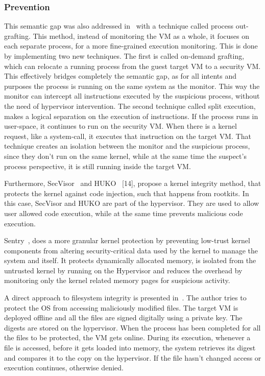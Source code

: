 \subsubsection{Prevention}

\par This semantic gap was also addressed in~\cite{srinivasan2011process} with a technique called process out-grafting. This method, instead of monitoring the \ac{VM} as a whole, it focuses on each separate process, for a more fine-grained execution monitoring. This is done by implementing two new techniques. The first is called on-demand grafting, which can relocate a running process from the guest target \ac{VM} to a security \ac{VM}. This effectively bridges completely the semantic gap, as for all intents and purposes the process is running on the same system as the monitor. This way the monitor can intercept all instructions executed by the suspicious process, without the need of hypervisor intervention. The second technique called split execution, makes a logical separation on the execution of instructions. If the process runs in user-space, it continues to run on the security \ac{VM}. When there is a kernel request, like a system-call, it executes that instruction on the target \ac{VM}. That technique creates an isolation between the monitor and the suspicious process, since they don’t run on the same kernel, while at the same time the suspect’s process perspective, it is still running inside the target \ac{VM}. 


\par Furthermore, SecVisor~\cite{seshadri2007secvisor} and HUKO~\cite{xiong2011practical} [14], propose a kernel integrity method, that protects the kernel against code injection, such that happens from rootkits. In this case, SecVisor and HUKO are part of the hypervisor. They are used to allow user allowed code execution, while at the same time prevents malicious code execution.


\par Sentry~\cite{srivastava2012efficient}, does a more granular kernel protection by preventing low-trust kernel components from altering security-critical data used by the kernel to manage the system and itself. It protects dynamically allocated memory, is isolated from the untrusted kernel by running on the Hypervisor and reduces the overhead by monitoring only the kernel related memory pages for suspicious activity.


\par A direct approach to filesystem integrity is presented in~\cite{nasab2012security}. The author tries to protect the \ac{OS} from accessing maliciously modified files. The target \ac{VM} is deployed offline and all the files are signed digitally using a private key. The digests are stored on the hypervisor. When the process has been completed for all the files to be protected, the \ac{VM} gets online. During its execution, whenever a file is accessed, before it gets loaded into memory, the system retrieves its digest and compares it to the copy on the hypervisor. If the file hasn’t changed access or execution continues, otherwise denied.

